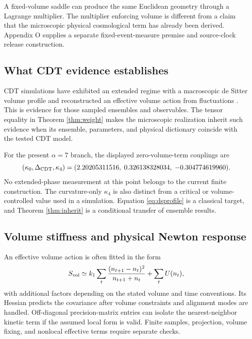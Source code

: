 A fixed-volume saddle can produce the same Euclidean geometry through a Lagrange multiplier. The multiplier enforcing volume is different from a claim that the microscopic physical cosmological term has already been derived. Appendix O supplies a separate fixed-event-measure premise and source-clock release construction.

\subsection{What CDT evidence establishes}

CDT simulations have exhibited an extended regime with a macroscopic de Sitter volume profile and reconstructed an effective volume action from fluctuations \cite{ds}. This is evidence for those sampled ensembles and observables. The tensor equality in Theorem \ref{thm:weight} makes the microscopic realization inherit such evidence when its ensemble, parameters, and physical dictionary coincide with the tested CDT model.

For the present $\alpha=7$ branch, the displayed zero-volume-term couplings are
\begin{equation}
(\kappa_0,\Delta_{\rm CDT},\kappa_4)
=(2.20205311516,\;0.326138328034,\;-0.304774619960).
\end{equation}
No extended-phase measurement at this point belongs to the current finite construction. The curvature-only $\kappa_4$ is also distinct from a critical or volume-controlled value used in a simulation. Equation \eqref{eq:dsprofile} is a classical target, and Theorem \ref{thm:inherit} is a conditional transfer of ensemble results.

\subsection{Volume stiffness and physical Newton response}

An effective volume action is often fitted in the form
\begin{equation}
S_{\rm vol}\simeq k_1\sum_t
\frac{(n_{t+1}-n_t)^2}{n_{t+1}+n_t}
+\sum_tU(n_t),
\end{equation}
with additional factors depending on the stated volume and time conventions. Its Hessian predicts the covariance after volume constraints and alignment modes are handled. Off-diagonal precision-matrix entries can isolate the nearest-neighbor kinetic term if the assumed local form is valid. Finite samples, projection, volume fixing, and nonlocal effective terms require separate checks.


